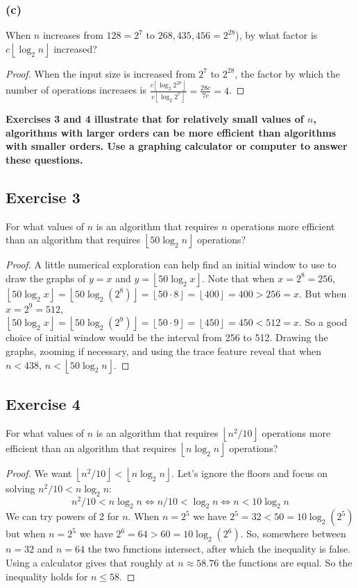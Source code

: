 \documentclass[14pt]{extarticle}
\newcommand{\dps}{\displaystyle}
\newcommand{\cy}{\color{cyan}}
\newcommand{\floor}[1]{{\left\lfloor#1\right\rfloor}}
\begin{document}
\subsubsection{(c)}
When \(n\) increases from \(128 = 2^7\) to \(268,435,456 = 2^{28}\)), by what factor is \(c \floor{\log_2 n}\) increased?

\begin{proof}
    When the input size is increased from \(2^7\) to \(2^{28}\), the factor by which the number of operations increases is
    \(\dps \frac{c \floor{\log_2 2^{28}}}{c \floor{\log_2 2^7}} = \frac{28c}{7c} = 4\).
\end{proof}

{\bf \cy Exercises 3 and 4 illustrate that for relatively small values of \(n\), algorithms with larger orders can be
more efficient than algorithms with smaller orders. Use a graphing calculator or computer to answer these questions.}

\subsection{Exercise 3}
For what values of \(n\) is an algorithm that requires \(n\) operations more efficient than an algorithm that requires
\(\floor{50 \log_2 n}\) operations?

\begin{proof}
    A little numerical exploration can help find an initial window to use to draw the graphs of \(y = x\) and \(y = \floor{50
        \log_2 x}\). Note that when \(x = 2^8 = 256\), \(\floor{50 \log_2 x} = \floor{50 \log_2(2^8)} = \floor{50 \cdot 8} =
    \floor{400} = 400 > 256 = x\). But when \(x = 2^9 = 512\), \(\floor{50 \log_2 x} = \floor{50 \log_2(2^9)} = \floor{50
        \cdot 9} = \floor{450} = 450 < 512 = x\). So a good choice of initial window would be the interval from 256 to 512. Drawing
    the graphs, zooming if necessary, and using the trace feature reveal that when \(n < 438\), \(n < \floor{50 \log_2 n}\).
\end{proof}

\subsection{Exercise 4}
For what values of \(n\) is an algorithm that requires \(\floor{n^2/10}\) operations more efficient than an algorithm
that requires \(\floor{n \log_2 n}\) operations?

\begin{proof}
    We want \(\floor{n^2/10} < \floor{n \log_2 n}\). Let's ignore the floors and focus on solving \(n^2/10 < n \log_2 n\):
    \[
        n^2/10 < n \log_2 n \iff n/10 < \log_2 n \iff n < 10\log_2 n
    \]
    We can try powers of 2 for \(n\). When \(n = 2^5\) we have \(2^5 = 32 < 50 = 10\log_2(2^5)\) but when \(n = 2^5\) we have
    \(2^6 = 64 > 60 = 10\log_2(2^6)\). So, somewhere between \(n = 32\) and \(n = 64\) the two functions intersect, after which
    the inequality is false. Using a calculator gives that roughly at \(n \approx 58.76\) the functions are equal. So the
    inequality holds for \(n \leq 58\).
\end{proof}
\end{document}
